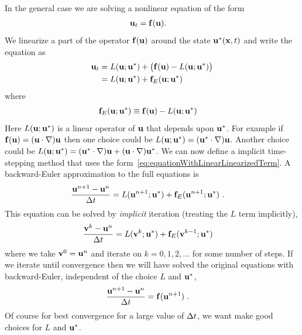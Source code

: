 In the general case we are solving a nonlinear equation of the form
\begin{align*}
  \mathbf{ u}_t & = \mathbf{ f}(\mathbf{ u}) .
\end{align*}  
We linearize a part of the operator $\mathbf{ f}(\mathbf{ u})$ around the state $\mathbf{ u}^*(\mathbf{ x},t)$ and write the equation as
\begin{align}
  \mathbf{ u}_t & = L(\mathbf{ u}; \mathbf{ u}^*) + \big( \mathbf{ f}(\mathbf{ u}) - L(\mathbf{ u}; \mathbf{ u}^*) \big) \\  \label{eq:equationWithLinearLinearizedTerm}
        & = L(\mathbf{ u}; \mathbf{ u}^*) + \mathbf{ f}_E(\mathbf{ u}; \mathbf{ u}^*) 
\end{align} 
where
\begin{align}
  \mathbf{ f}_E(\mathbf{ u}; \mathbf{ u}^*) & \equiv \mathbf{ f}(\mathbf{ u}) - L(\mathbf{ u}; \mathbf{ u}^*)
\end{align}  
Here $L(\mathbf{ u}; \mathbf{ u}^*)$ is a linear operator of $\mathbf{ u}$ that depends upon $\mathbf{ u}^*$.
For example if $\mathbf{ f}(\mathbf{ u})=(\mathbf{ u}\cdot\nabla)\mathbf{ u}$ then one choice could be
$ L(\mathbf{ u}; \mathbf{ u}^*) = (\mathbf{ u}^*\cdot\nabla)\mathbf{ u}$.  Another choice could be 
$ L(\mathbf{ u}; \mathbf{ u}^*) = (\mathbf{ u}^*\cdot\nabla)\mathbf{ u} + (\mathbf{ u}\cdot\nabla)\mathbf{ u}^*$.
% 
We can now define a implicit time-stepping method that uses the form~\eqref{eq:equationWithLinearLinearizedTerm}.
% 
A backward-Euler approximation to the full equations is
\begin{align*}
{ \mathbf{ u}^{n+1} - \mathbf{ u}^n \over {\Delta t}} &= L(\mathbf{ u}^{n+1}; \mathbf{ u}^*) + \mathbf{ f}_E(\mathbf{ u}^{n+1}; \mathbf{ u}^*)  ~.
\end{align*} 
This equation can be solved by {\em implicit} iteration (treating the $L$ term implicitly),
\begin{align*}
{ \mathbf{ v}^k - \mathbf{ u}^n \over {\Delta t}} &= L(\mathbf{ v}^k; \mathbf{ u}^*) + \mathbf{ f}_E(\mathbf{ v}^{k-1}; \mathbf{ u}^*) 
\end{align*}  
where we take $\mathbf{ v}^0=\mathbf{ u}^n$ and iterate on $k=0,1,2,...$ for some number of steps. If we iterate until convergence then
we will have solved the original equations with backward-Euler, independent of the choice $L$ and $\mathbf{ u}^*$,
\begin{align*}
{ \mathbf{ u}^{n+1} - \mathbf{ u}^n \over {\Delta t}} &= \mathbf{ f}(\mathbf{ u}^{n+1})  ~.
\end{align*} 
Of course for best convergence for a large value of ${\Delta t}$, we want make good choices for $L$ and $\mathbf{ u}^*$.






